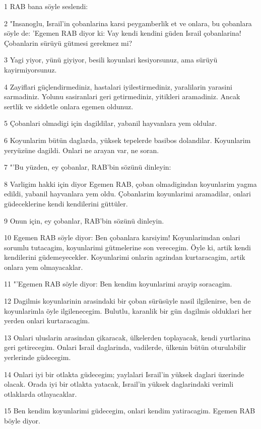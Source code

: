 \par 1 RAB bana söyle seslendi:
\par 2 "Insanoglu, Israil'in çobanlarina karsi peygamberlik et ve onlara, bu çobanlara söyle de: 'Egemen RAB diyor ki: Vay kendi kendini güden Israil çobanlarina! Çobanlarin sürüyü gütmesi gerekmez mi?
\par 3 Yagi yiyor, yünü giyiyor, besili koyunlari kesiyorsunuz, ama sürüyü kayirmiyorsunuz.
\par 4 Zayiflari güçlendirmediniz, hastalari iyilestirmediniz, yaralilarin yarasini sarmadiniz. Yolunu sasiranlari geri getirmediniz, yitikleri aramadiniz. Ancak sertlik ve siddetle onlara egemen oldunuz.
\par 5 Çobanlari olmadigi için dagildilar, yabanil hayvanlara yem oldular.
\par 6 Koyunlarim bütün daglarda, yüksek tepelerde basibos dolandilar. Koyunlarim yeryüzüne dagildi. Onlari ne arayan var, ne soran.
\par 7 "'Bu yüzden, ey çobanlar, RAB'bin sözünü dinleyin:
\par 8 Varligim hakki için diyor Egemen RAB, çoban olmadigindan koyunlarim yagma edildi, yabanil hayvanlara yem oldu. Çobanlarim koyunlarimi aramadilar, onlari güdeceklerine kendi kendilerini güttüler.
\par 9 Onun için, ey çobanlar, RAB'bin sözünü dinleyin.
\par 10 Egemen RAB söyle diyor: Ben çobanlara karsiyim! Koyunlarimdan onlari sorumlu tutacagim, koyunlarimi gütmelerine son verecegim. Öyle ki, artik kendi kendilerini güdemeyecekler. Koyunlarimi onlarin agzindan kurtaracagim, artik onlara yem olmayacaklar.
\par 11 "'Egemen RAB söyle diyor: Ben kendim koyunlarimi arayip soracagim.
\par 12 Dagilmis koyunlarinin arasindaki bir çoban sürüsüyle nasil ilgilenirse, ben de koyunlarimla öyle ilgilenecegim. Bulutlu, karanlik bir gün dagilmis olduklari her yerden onlari kurtaracagim.
\par 13 Onlari uluslarin arasindan çikaracak, ülkelerden toplayacak, kendi yurtlarina geri getirecegim. Onlari Israil daglarinda, vadilerde, ülkenin bütün oturulabilir yerlerinde güdecegim.
\par 14 Onlari iyi bir otlakta güdecegim; yaylalari Israil'in yüksek daglari üzerinde olacak. Orada iyi bir otlakta yatacak, Israil'in yüksek daglarindaki verimli otlaklarda otlayacaklar.
\par 15 Ben kendim koyunlarimi güdecegim, onlari kendim yatiracagim. Egemen RAB böyle diyor.
